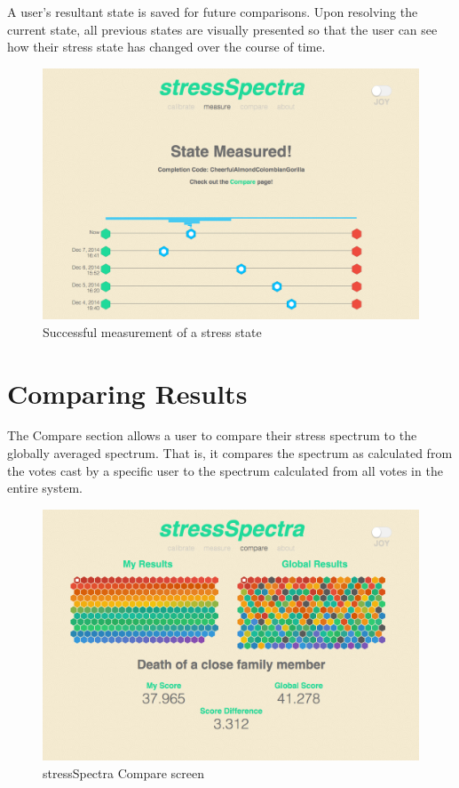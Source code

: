 \documentclass{sigchi}
\begin{document}
A user's resultant state is saved for future comparisons. Upon resolving the current state, all previous states are visually presented so that the user can see how their stress state has changed over the course of time.  
\begin{figure}[!h]
\centering
\includegraphics[width=0.9\columnwidth]{measure2}
\caption{Successful measurement of a stress state}
\label{fig:measure}
\end{figure}

\section{Comparing Results}
The Compare section allows a user to compare their stress spectrum to the globally averaged spectrum. That is, it compares the spectrum as calculated from the votes cast by a specific user to the spectrum calculated from all votes in the entire system.
\begin{figure}[!h]
\centering
\includegraphics[width=0.9\columnwidth]{compare}
\caption{stressSpectra Compare screen}
\label{fig:compare}
\end{figure}
\end{document}
